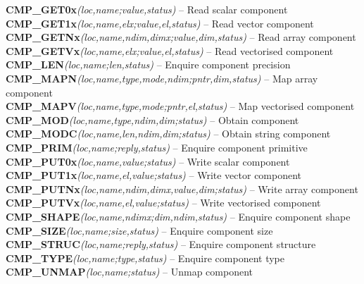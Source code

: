 \documentclass[11pt]{article}
\newcommand{\htmlref}[2]{#1}
\newcommand{\st}[1]{{\em{#1}}}
\begin{document}
\label{appendix:cmproutines}
\small
\noindent
{\bf \htmlref{CMP\_GET0x}{CMP_GET0x}}\st{(loc,name;value,status)} -- Read scalar component\\
{\bf \htmlref{CMP\_GET1x}{CMP_GET1x}}\st{(loc,name,elx;value,el,status)} -- Read vector component\\
{\bf \htmlref{CMP\_GETNx}{CMP_GETNx}}\st{(loc,name,ndim,dimx;value,dim,status)} -- Read array component\\
{\bf \htmlref{CMP\_GETVx}{CMP_GETVx}}\st{(loc,name,elx;value,el,status)} -- Read vectorised component\\
{\bf \htmlref{CMP\_LEN}{CMP_LEN}}\st{(loc,name;len,status)} -- Enquire component precision\\
{\bf \htmlref{CMP\_MAPN}{CMP_MAPN}}\st{(loc,name,type,mode,ndim;pntr,dim,status)} -- Map array component\\
{\bf \htmlref{CMP\_MAPV}{CMP_MAPV}}\st{(loc,name,type,mode;pntr,el,status)} -- Map vectorised component\\
{\bf \htmlref{CMP\_MOD}{CMP_MOD}}\st{(loc,name,type,ndim,dim;status)} -- Obtain component\\
{\bf \htmlref{CMP\_MODC}{CMP_MODC}}\st{(loc,name,len,ndim,dim;status)} -- Obtain string component\\
{\bf \htmlref{CMP\_PRIM}{CMP_PRIM}}\st{(loc,name;reply,status)} -- Enquire component primitive\\
{\bf \htmlref{CMP\_PUT0x}{CMP_PUT0x}}\st{(loc,name,value;status)} -- Write scalar component\\
{\bf \htmlref{CMP\_PUT1x}{CMP_PUT1x}}\st{(loc,name,el,value;status)} -- Write vector component\\
{\bf \htmlref{CMP\_PUTNx}{CMP_PUTNx}}\st{(loc,name,ndim,dimx,value,dim;status)} -- Write array component\\
{\bf \htmlref{CMP\_PUTVx}{CMP_PUTVx}}\st{(loc,name,el,value;status)} -- Write vectorised component\\
{\bf \htmlref{CMP\_SHAPE}{CMP_SHAPE}}\st{(loc,name,ndimx;dim,ndim,status)} -- Enquire component shape\\
{\bf \htmlref{CMP\_SIZE}{CMP_SIZE}}\st{(loc,name;size,status)} -- Enquire component size\\
{\bf \htmlref{CMP\_STRUC}{CMP_STRUC}}\st{(loc,name;reply,status)} -- Enquire component structure\\
{\bf \htmlref{CMP\_TYPE}{CMP_TYPE}}\st{(loc,name;type,status)} -- Enquire component type\\
{\bf \htmlref{CMP\_UNMAP}{CMP_UNMAP}}\st{(loc,name;status)} -- Unmap component\\
\end{document}
